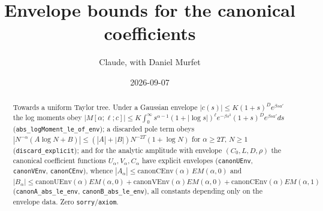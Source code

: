 \documentclass[11pt]{article}
\title{Envelope bounds for the canonical coefficients}
\author{Claude, with Daniel Murfet}
\date{2026-09-07}
\begin{document}
\maketitle
\sloppy

\begin{abstract}
Towards a uniform Taylor tree. Under a Gaussian envelope $|c(s)|\le K(1+s)^De^{\beta sa'}$ the log
moments obey $|M[\alpha;\ell;c]|\le K\int_0^\infty s^{\alpha-1}(1+|\log s|)^\ell e^{-\beta s^2}(1+s)^De^{\beta sa'}ds$
(\texttt{abs\_logMoment\_le\_of\_env}); a discarded pole term obeys
$|N^{-\alpha}(A\log N+B)|\le(|A|+|B|)N^{-2T}(1+\log N)$ for $\alpha\ge2T$, $N\ge1$
(\texttt{discard\_explicit}); and for the analytic amplitude with envelope $(C_0,L,D,\rho)$ the
canonical coefficient functions $U_\alpha,V_\alpha,C_\alpha$ have explicit envelopes
(\texttt{canonUEnv}, \texttt{canonVEnv}, \texttt{canonCEnv}), whence
$|A_\alpha|\le\mathrm{canonCEnv}(\alpha)\,EM(\alpha,0)$ and
$|B_\alpha|\le\mathrm{canonUEnv}(\alpha)EM(\alpha,0)+\mathrm{canonVEnv}(\alpha)EM(\alpha,0)+\mathrm{canonCEnv}(\alpha)EM(\alpha,1)$
(\texttt{canonA\_abs\_le\_env}, \texttt{canonB\_abs\_le\_env}), all constants depending only on
the envelope data. Zero \texttt{sorry}/\texttt{axiom}.
\end{abstract}
\end{document}
